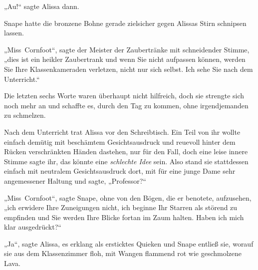 „Au!“ sagte Alissa dann.

Snape hatte die bronzene Bohne gerade zielsicher gegen Alissas Stirn schnipsen lassen.

„Miss~Cornfoot“, sagte der Meister der Zaubertränke mit schneidender Stimme, „dies ist ein heikler Zaubertrank und wenn Sie nicht aufpassen können, werden Sie Ihre Klassenkameraden verletzen, nicht nur sich selbst. Ich sehe Sie nach dem Unterricht.“

Die letzten sechs Worte waren überhaupt nicht hilfreich, doch sie strengte sich noch mehr an und schaffte es, durch den Tag zu kommen, ohne irgendjemanden zu schmelzen.

Nach dem Unterricht trat Alissa vor den Schreibtisch. Ein Teil von ihr wollte einfach demütig mit beschämtem Gesichtsausdruck und reuevoll hinter dem Rücken verschränkten Händen dastehen, nur für den Fall, doch eine leise innere Stimme sagte ihr, das könnte eine \emph{schlechte Idee} sein. Also stand sie stattdessen einfach mit neutralem Gesichtsausdruck dort, mit für eine junge Dame sehr angemessener Haltung und sagte,
„Professor?“

„Miss~Cornfoot“, sagte Snape, ohne von den Bögen, die er benotete, aufzusehen, „ich erwidere Ihre Zuneigungen nicht, ich beginne Ihr Starren als störend zu empfinden und Sie werden Ihre Blicke fortan im Zaum halten. Haben ich mich klar ausgedrückt?“

„Ja“, sagte Alissa, es erklang als ersticktes Quieken und Snape entließ sie, worauf sie aus dem Klassenzimmer floh, mit Wangen flammend rot wie geschmolzene Lava.%

